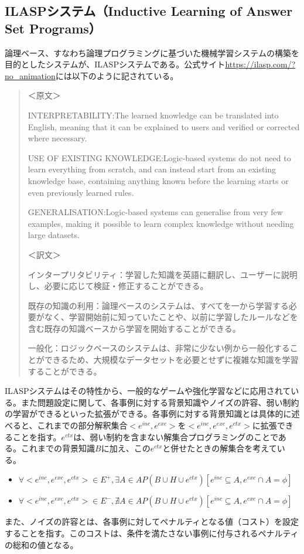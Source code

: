 \documentclass[dvipdfmx]{jsarticle}
\begin{document}
\subsection{ILASPシステム（Inductive Learning of Answer Set Programs）}
論理ベース、すなわち論理プログラミングに基づいた機械学習システムの構築を目的としたシステムが、ILASPシステムである。公式サイト\url{https://ilasp.com/?no_animation}には以下のように記されている。
\begin{quote}
  ＜原文＞\par
  INTERPRETABILITY:The learned knowledge can be translated into English, meaning that it can be explained to users and verified or corrected where necessary.\par
  USE OF EXISTING KNOWLEDGE:Logic-based systems do not need to learn everything from scratch, and can instead start from an existing knowledge base, containing anything known before the learning starts or even previously learned rules.\par
  GENERALISATION:Logic-based systems can generalise from very few examples, making it possible to learn complex knowledge without needing large datasets.\par

  ＜訳文＞\par
  インタープリタビリティ：学習した知識を英語に翻訳し、ユーザーに説明し、必要に応じて検証・修正することができる。\par
  既存の知識の利用：論理ベースのシステムは、すべてを一から学習する必要がなく、学習開始前に知っていたことや、以前に学習したルールなどを含む既存の知識ベースから学習を開始することができる。\par
  一般化：ロジックベースのシステムは、非常に少ない例から一般化することができるため、大規模なデータセットを必要とせずに複雑な知識を学習することができる。\par
\end{quote}
ILASPシステムはその特性から、一般的なゲームや強化学習などに応用されている。また問題設定に関して、各事例に対する背景知識やノイズの許容、弱い制約の学習ができるといった拡張ができる。各事例に対する背景知識とは具体的に述べると、これまでの部分解釈集合$<e^{inc}, e^{exc}>$を$<e^{inc}, e^{exc}, e^{ctx}>$に拡張できることを指す。$e^{ctx}$は、弱い制約を含まない解集合プログラミングのことである。これまでの背景知識$B$に加え、この$e^{ctx}$と併せたときの解集合を考えている。
\begin{itemize}
  \item $\forall <e^{inc}, e^{exc}, e^{ctx}> \in E^+ , \exists A \in AP(B \cup H \cup e^{ctx})[e^{inc} \subseteq A, e^{exc} \cap A = \phi]$
  \item $\forall <e^{inc}, e^{exc}, e^{ctx}> \in E^- , \nexists A \in AP(B \cup H \cup e^{ctx})[e^{inc} \subseteq A, e^{exc} \cap A = \phi]$
\end{itemize}
また、ノイズの許容とは、各事例に対してペナルティとなる値（コスト）を設定することを指す。このコストは、条件を満たさない事例に付与されるペナルティの総和の値となる。
\end{document}
